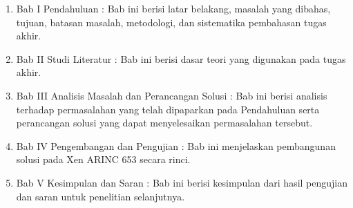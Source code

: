 \begin{enumerate}
    \item Bab I Pendahuluan : Bab ini berisi latar belakang, masalah yang dibahas, tujuan, batasan masalah, metodologi, dan sistematika pembahasan tugas akhir.

    \item Bab II Studi Literatur : Bab ini berisi dasar teori yang digunakan pada tugas akhir.
    \item Bab III Analisis Masalah dan Perancangan Solusi : Bab ini berisi analisis terhadap permasalahan yang telah dipaparkan pada Pendahuluan serta perancangan solusi yang dapat menyelesaikan permasalahan tersebut.

    \item Bab IV Pengembangan dan Pengujian : Bab ini menjelaskan pembangunan solusi pada Xen ARINC 653 secara rinci.

    \item Bab V Kesimpulan dan Saran : Bab ini berisi kesimpulan dari hasil pengujian dan saran untuk penelitian selanjutnya.
\end{enumerate}
